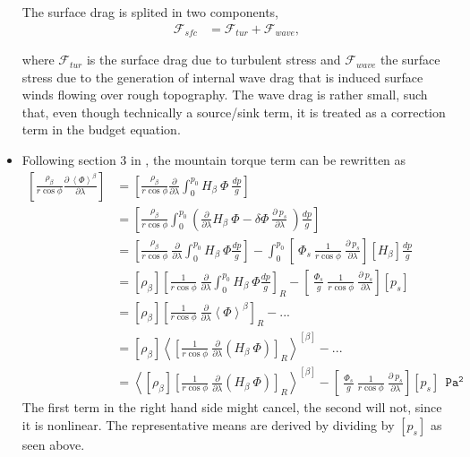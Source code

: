 \documentclass[11pt]{article}
\numberwithin{equation}{section}
\newcommand{\la}{\langle}
\newcommand{\ra}{\rangle}
\newcommand{\lara}[1]{\left\la{#1}\right\ra}
\newcommand{\cphi}{\cos \phi}
\newcommand{\rb}{\rho_\beta}
\begin{document}
\begin{itemize}
The surface drag is splited in two components,
\begin{align}
\mathcal{F}_{sfc}&= \mathcal{F}_{tur} + \mathcal{F}_{wave},
\end{align}

where $\mathcal{F}_{tur}$ is the surface drag due to turbulent stress and $\mathcal{F}_{wave}$ the surface stress due to the generation of internal wave drag that is induced surface winds flowing over rough topography. The wave drag is rather small, such that, even though technically a source/sink term, it is treated as a correction term in the budget equation.


\item Following section 3 in \citet{Boer1982}, the mountain torque term can be rewritten as 
\begin{align*}
\left[\frac{\rb }{r \cphi} \frac{\partial~\lara{\Phi}^\beta  }{\partial \lambda}  \right] & = \left[ \frac{\rb}{r \cphi} \frac{\partial}{\partial \lambda}  \int_0^{p_0} H_\beta  ~\Phi ~ \frac{dp}{g}\right]\\
&= \left[ \frac{\rb}{r \cphi} \int_0^{p_0}   \left( \frac{\partial}{\partial \lambda}  H_\beta  ~\Phi - \delta \Phi ~ \frac{\partial~p_s}{\partial \lambda} ~ \right) \frac{dp}{g}\right]\\
&= \left[ \frac{\rb}{r \cphi} ~ \frac{\partial}{\partial \lambda}  \int_0^{p_0} H_\beta  ~\Phi  \frac{dp}{g}\right] - \int_0^{p_0}  \left[~\Phi_s~ \frac{1}{r \cphi} ~\frac{\partial~p_s}{\partial \lambda}\right] [H_\beta] \frac{dp}{g}\\
&= [\rb]  \left[ \frac{1}{r \cphi} ~ \frac{\partial}{\partial \lambda}  \int_0^{p_0} H_\beta  ~\Phi  \frac{dp}{g}\right]_R - \left[~\frac{\Phi_s}{g}~ \frac{1}{r \cphi} ~\frac{\partial~p_s}{\partial \lambda}\right] [p_s] \\
&= [\rb]  \left[ \frac{1}{r \cphi} ~ \frac{\partial}{\partial \lambda}  \lara{\Phi}^\beta \right]_R - ... \\
&= [\rb]  \lara{ \left[ \frac{1}{r \cphi} ~ \frac{\partial}{\partial \lambda} \left( H_\beta  ~\Phi  \right)   \right]_R}^{[\beta]} - ...  \\
&=\lara{  [\rb]   \left[ \frac{1}{r \cphi} ~ \frac{\partial}{\partial \lambda} \left( H_\beta  ~\Phi  \right)   \right]_R}^{[\beta]} - \left[~\frac{\Phi_s}{g}~ \frac{1}{r \cphi} ~\frac{\partial~p_s}{\partial \lambda}\right]  [p_s]~~\mathtt{Pa^2} 
\end{align*}
The first term in the right hand side might cancel, the second will not, since it is nonlinear. The representative means are derived by dividing by $[p_s]$ as seen above.
\end{itemize}
\end{document}
